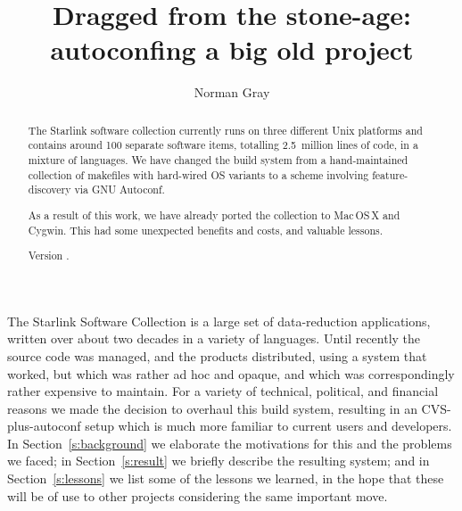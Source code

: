 \documentclass{speauth}
\begin{document}


\title{Dragged from the stone-age: autoconfing a big old project}

\author{Norman Gray\footnotemark}

\noreceived{}
\norevised{}
\noaccepted{}



\begin{abstract}
The Starlink software collection currently runs on three different
Unix platforms and contains around 100 separate software items,
totalling 2.5~million lines of code, in a mixture of languages.  We
have changed the build system from a hand-maintained collection of
makefiles with hard-wired OS variants to a scheme involving
feature-discovery via GNU Autoconf.

As a result of this work, we have already ported the collection to
Mac\,OS\,X and Cygwin.  This had some unexpected benefits and costs, and
valuable lessons.

Version \RCSRevision.
\end{abstract}



The Starlink Software Collection \cite{draper05} is a large set of
data-reduction 
applications, written over about two decades in a variety of
languages.  Until recently the source code was managed, and the
products distributed, using a system that worked, but which was
rather ad hoc and opaque, and which was correspondingly rather
expensive to maintain.  For a variety of technical, political, and financial
reasons we made the decision to overhaul this build system, resulting
in an CVS-plus-autoconf setup which is much more familiar to current users and
developers.   In Section~\ref{s:background} we elaborate the
motivations for this and the problems we faced; in
Section~\ref{s:result} we briefly describe the resulting system; and
in Section~\ref{s:lessons} we list some of the lessons we learned, in
the hope that these will be of use to other projects considering the
same important move.
\end{document}
